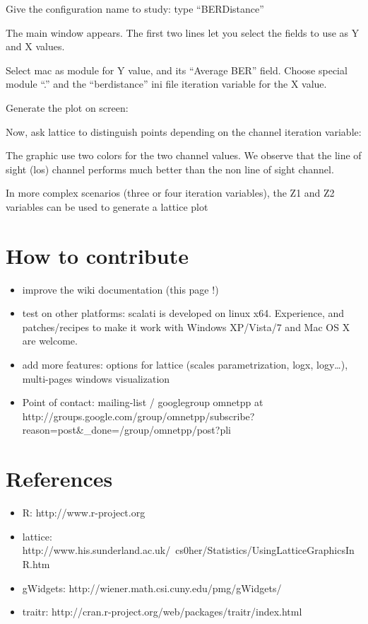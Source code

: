 Give the configuration name to study: type “BERDistance”

The main window appears. The first two lines let you select the fields to use as Y and X values.

Select mac as module for Y value, and its “Average BER” field. Choose special module “.” and the “berdistance” ini file iteration variable for the X value.

Generate the plot on screen:

Now, ask lattice to distinguish points depending on the channel iteration variable:

The graphic use two colors for the two channel values. We observe that the line of sight (los) channel performs much better than the non line of sight channel.

In more complex scenarios (three or four iteration variables), the Z1 and Z2 variables can be used to generate a lattice plot

\section{How to contribute}

\begin{itemize}
\item improve the wiki documentation (this page !)
\item test on other platforms: scalati is developed on linux x64. Experience, and patches/recipes to make it work with Windows XP/Vista/7 and Mac OS X are welcome.
\item add more features: options for lattice (scales parametrization, logx, logy…), multi-pages windows visualization
\item Point of contact: mailing-list / googlegroup omnetpp at http://groups.google.com/group/omnetpp/subscribe?reason=post&_done=/group/omnetpp/post?pli%
\end{itemize}

\section{References}

\begin{itemize}
\item R: http://www.r-project.org
\item lattice: http://www.his.sunderland.ac.uk/~cs0her/Statistics/UsingLatticeGraphicsInR.htm
\item gWidgets: http://wiener.math.csi.cuny.edu/pmg/gWidgets/
\item traitr: http://cran.r-project.org/web/packages/traitr/index.html
\end{itemize}


